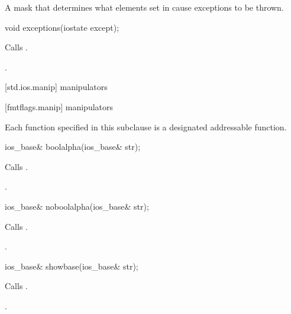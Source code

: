 \begin{itemdescr}
\pnum
\returns
A mask that determines what elements set in
cause exceptions to be thrown.
\end{itemdescr}

%
\begin{itemdecl}
void exceptions(iostate except);
\end{itemdecl}

\begin{itemdescr}
\pnum
\effects
Calls
.

\pnum
\ensures
{}.
\end{itemdescr}

[std.ios.manip]{ manipulators}

[fmtflags.manip]{ manipulators}

\pnum
Each function specified in this subclause
is a designated addressable function.

%
\begin{itemdecl}
ios_base& boolalpha(ios_base& str);
\end{itemdecl}

\begin{itemdescr}
\pnum
\effects
Calls
.

\pnum
\returns
{}.
\end{itemdescr}

%
\begin{itemdecl}
ios_base& noboolalpha(ios_base& str);
\end{itemdecl}

\begin{itemdescr}
\pnum
\effects
Calls
.

\pnum
\returns
{}.
\end{itemdescr}

%
\begin{itemdecl}
ios_base& showbase(ios_base& str);
\end{itemdecl}

\begin{itemdescr}
\pnum
\effects
Calls
.

\pnum
\returns
{}.
\end{itemdescr}

